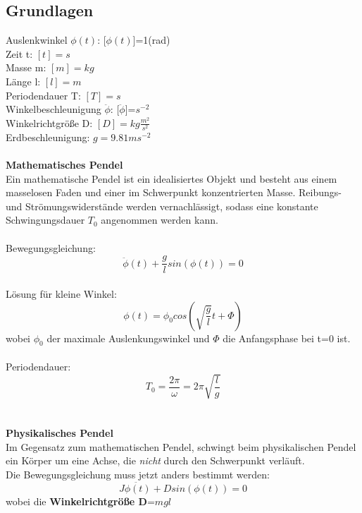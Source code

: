 \documentclass{article}
\begin{document}
\subsection{Grundlagen}
Auslenkwinkel $\phi(t)$: [$\phi(t)$]=1(rad)\\
Zeit t: $[t]=s$\\
Masse m: $[m]=kg$\\
Länge l: $[l]=m$\\
Periodendauer T: $[T]=s$\\
Winkelbeschleunigung $\ddot{\phi}$: [$\ddot{\phi}$]=$s^{-2}$\\
Winkelrichtgröße D: $[D]=kg \frac{m^2}{s^2}$\\
Erdbeschleunigung: $g=9.81ms^{-2}$\\
\\
\textbf{Mathematisches Pendel}\\
Ein mathematische Pendel ist ein idealisiertes Objekt und besteht aus einem masselosen Faden und einer im Schwerpunkt konzentrierten Masse. Reibungs- und Strömungswiderstände werden vernachlässigt, sodass eine konstante Schwingungsdauer $T_0$ angenommen werden kann.\\
\\
Bewegungsgleichung:
\begin{equation*}
\ddot{\phi}(t)+\frac{g}{l}sin(\phi(t))=0
\end{equation*}\\
Lösung für kleine Winkel:
\begin{equation*}
\phi(t)=\phi_0cos(\sqrt{\frac{g}{l}}t+\Phi)
\end{equation*}
wobei $\phi_0$ der maximale Auslenkungswinkel und $\Phi$ die Anfangsphase bei t=0 ist. \\
\\
Periodendauer:
\begin{equation*}
T_0 = \frac{2\pi}{\omega} = 2\pi\sqrt{\frac{l}{g}}
\end{equation*}\\
\\
\textbf{Physikalisches Pendel}\\
Im Gegensatz zum mathematischen Pendel, schwingt beim physikalischen Pendel ein Körper um eine Achse, die \textit{nicht} durch den Schwerpunkt verläuft.\\
Die Bewegungsgleichung muss jetzt anders bestimmt werden:
\begin{equation*}
J\ddot{\phi(t)} + D sin(\phi(t)) = 0
\end{equation*}
wobei die \textbf{Winkelrichtgröße D}=$mgl$\\
\end{document}
